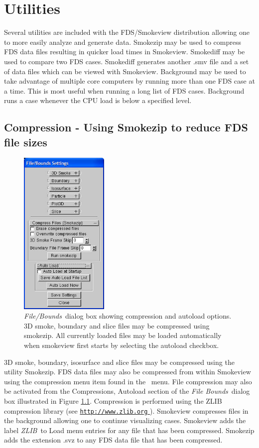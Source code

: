 \documentclass[11pt,twoside]{book}
\newcommand{\figoptions}{hbp}
\newcommand{\hhref}[1]{\href{#1}{{\tt #1}
}}
\newcommand{\frameit}[1]{\fbox{\tt #1}}
\begin{document}
\chapter{Utilities}
Several utilities are included with the FDS/Smokeview distribution allowing one
to more easily analyze and generate data.  Smokezip may be used to compress
FDS data files resulting in quicker load times in Smokeview.  Smokediff may be used
to compare two FDS cases.  Smokediff generates another .smv file and a set of data files
which can be viewed with Smokeview.  Background may be used to take advantage of multiple
core computers by running more than one FDS case at a time.  This is most useful when running
a long list of FDS cases. Background runs a case whenever the CPU load is below a specified level.


\section{Compression - Using Smokezip to reduce FDS file sizes}
\label{ch:smokezip}

\begin{figure}[\figoptions]
\centerline{\includegraphics[width=1.6736in]{figures/figBOUND1} }
\caption[{\em Compress Files}\ and {\em Autoload}\ dialog box.] {{\em File/Bounds}\ dialog
box showing compression and autoload options.  3D smoke,  boundary and slice
files may be compressed using smokezip.  All currently loaded
files may be loaded automatically when smokeview first starts by
selecting the autoload checkbox.} \label{figBOUNDScompress}
\end{figure}

3D smoke, boundary, isosurface and slice files may be compressed using the
utility Smokezip.  FDS data files may also be compressed from within Smokeview using the
compression menu item found in the \frameit{Load/Unload}\ menu.  File
compression may also be activated from the Compressions, Autoload
section of the {\em File Bounds}\ dialog box illustrated in Figure
\ref{figBOUNDScompress}. Compression is performed using the ZLIB
compression library (see \hhref{http://www.zlib.org}).
Smokeview compresses files in the background
allowing one to continue visualizing cases.  Smokeview adds the label
{\em ZLIB}\ to Load menu entries for any file that has been
compressed. Smokezip adds the extension .svz to any FDS data file that has been compressed.
\end{document}
